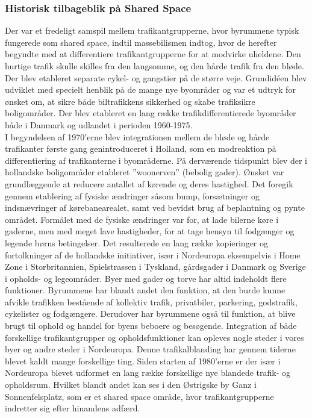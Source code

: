\subsubsection{Historisk tilbageblik på Shared Space}
\label{subs:historisk_tilbageblik_paa_shared_space}
Der var et fredeligt samspil mellem trafikantgrupperne, hvor byrummene typisk fungerede som shared space, indtil massebilismen indtog, hvor de herefter begyndte med at differentiere trafikantgrupperne for at modvirke uheldene. Den hurtige trafik skulle skilles fra den langsomme, og den hårde trafik fra den bløde. Der blev etableret separate cykel- og gangstier på de større veje. Grundidéen blev udviklet med specielt henblik på de mange nye byområder og var et udtryk for ønsket om, at sikre både biltrafikkens sikkerhed og skabe trafiksikre boligområder. Der blev etableret en lang række trafikdifferentierede byområder både i Danmark og udlandet i perioden 1960-1975.
\\
I begyndelsen af 1970’erne blev integrationen mellem de bløde og hårde trafikanter første gang genintroduceret i Holland, som en modreaktion på differentiering af trafikanterne i byområderne. På derværende tidspunkt blev der i hollandske boligområder etableret ”woonerven” (bebolig gader). Ønsket var grundlæggende at reducere antallet af kørende og deres hastighed. Det foregik gennem etablering af fysiske ændringer såsom bump, forsætninger og indsnævringer af kørebanearealet, samt ved bevidst brug af beplantning og pynte området. Formålet med de fysiske ændringer var for, at lade bilerne køre i gaderne, men med meget lave hastigheder, for at tage hensyn til fodgænger og legende børns betingelser.  Det resulterede en lang række kopieringer og fortolkninger af de hollandske initiativer, især i Nordeuropa eksempelvis i Home Zone i Storbritannien, Spielstrassen i Tyskland, gårdsgader i Danmark og Sverige i opholds- og legeområder.
Byer med gader og torve har altid indeholdt flere funktioner.  Byrummene har blandt andet den funktion, at den burde kunne afvikle trafikken bestående af kollektiv trafik, privatbiler, parkering, godstrafik, cykelister og fodgængere. Derudover har byrummene også til funktion, at blive brugt til ophold og handel for byens beboere og besøgende.
Integration af både forskellige trafikantgrupper og opholdsfunktioner kan opleves nogle steder i vores byer og andre steder i Nordeuropa. Denne trafikalblanding har gennem tiderne blevet kaldt mange forskellige ting. Siden starten af 1980’erne er der især i Nordeuropa blevet udformet en lang række forskellige nye blandede trafik- og opholdsrum. \autocite{vejlednigomss2013}Hvilket blandt andet kan ses i den Østrigske by Ganz i Sonnenfelsplatz, som er et shared space område, hvor trafikantgrupperne indretter sig efter hinandens adfærd.\autocite{SP2015}

